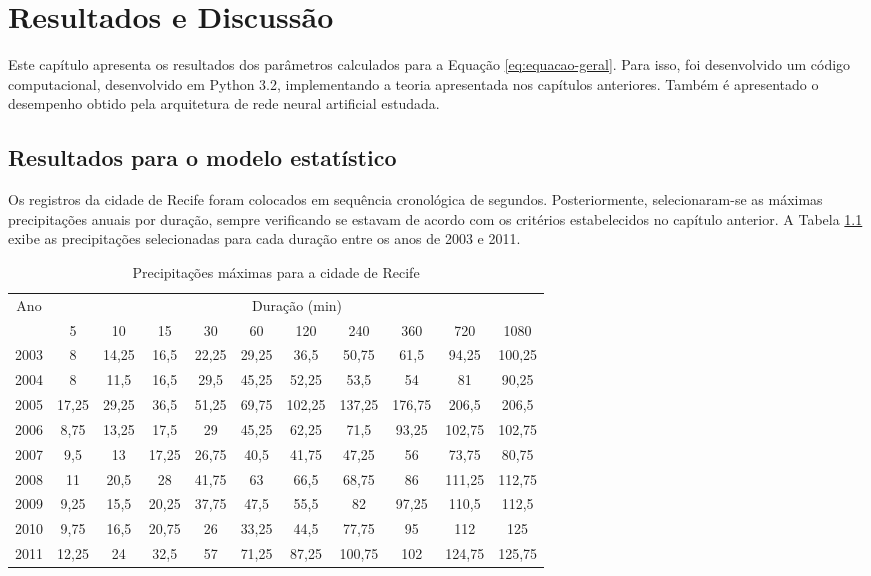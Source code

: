 \chapter{Resultados e Discussão}

Este capítulo apresenta os resultados dos parâmetros calculados para a Equação \ref{eq:equacao-geral}. Para isso, foi desenvolvido um código computacional, desenvolvido em Python 3.2, implementando a teoria apresentada nos capítulos anteriores. Também é apresentado o desempenho obtido pela arquitetura de rede neural artificial estudada. 

\section{Resultados para o modelo estatístico}

Os registros da cidade de Recife foram colocados em sequência cronológica de segundos. Posteriormente, selecionaram-se as máximas precipitações anuais por duração, sempre verificando se estavam de acordo com os critérios estabelecidos no capítulo anterior. A Tabela \ref{tab:precipitacoes-recife} exibe as precipitações selecionadas para cada duração entre os anos de 2003 e 2011.

\begin{table}[h]
\caption{Precipitações máximas para a cidade de Recife}
\begin{tabular}{ccccccccccc}
\toprule
\centering
Ano & \multicolumn{10}{c}{Duração (min)}                                                  \\ \cline{2-11} 
     & 5     & 10    & 15    & 30    & 60    & 120    & 240    & 360    & 720    & 1080   \\ \hline
2003 & 8     & 14,25 & 16,5  & 22,25 & 29,25 & 36,5   & 50,75  & 61,5   & 94,25  & 100,25 \\
2004 & 8     & 11,5  & 16,5  & 29,5  & 45,25 & 52,25  & 53,5   & 54     & 81     & 90,25  \\
2005 & 17,25 & 29,25 & 36,5  & 51,25 & 69,75 & 102,25 & 137,25 & 176,75 & 206,5  & 206,5  \\
2006 & 8,75  & 13,25 & 17,5  & 29    & 45,25 & 62,25  & 71,5   & 93,25  & 102,75 & 102,75 \\
2007 & 9,5   & 13    & 17,25 & 26,75 & 40,5  & 41,75  & 47,25  & 56     & 73,75  & 80,75  \\
2008 & 11    & 20,5  & 28    & 41,75 & 63    & 66,5   & 68,75  & 86     & 111,25 & 112,75 \\
2009 & 9,25  & 15,5  & 20,25 & 37,75 & 47,5  & 55,5   & 82     & 97,25  & 110,5  & 112,5  \\
2010 & 9,75  & 16,5  & 20,75 & 26    & 33,25 & 44,5   & 77,75  & 95     & 112    & 125    \\
2011 & 12,25 & 24    & 32,5  & 57    & 71,25 & 87,25  & 100,75 & 102    & 124,75 & 125,75 \\ \bottomrule
\end{tabular}
\label{tab:precipitacoes-recife}
\end{table}

